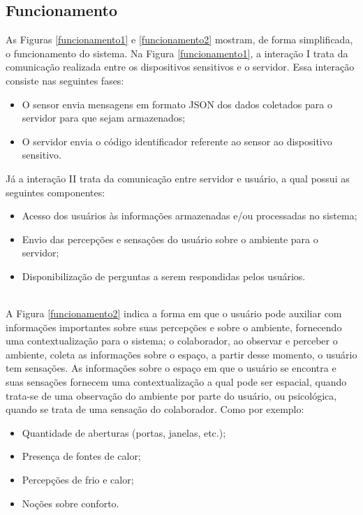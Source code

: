 \subsection{Funcionamento}
\null \quad As Figuras \ref{funcionamento1} e \ref{funcionamento2} mostram, de forma simplificada, o funcionamento do sistema. Na Figura \ref{funcionamento1}, a interação I trata da comunicação realizada entre os dispositivos sensitivos e o servidor. Essa interação consiste nas seguintes fases:

\begin{itemize}
  \item O sensor envia mensagens em formato JSON dos dados coletados para o servidor para que sejam armazenados;
  \item O servidor envia o código identificador referente ao sensor ao dispositivo sensitivo.
\end{itemize}

\null Já a interação II trata da comunicação entre servidor e usuário, a qual possui as seguintes componentes:
\begin{itemize}
  \item Acesso dos usuários às informações armazenadas e/ou processadas no sistema;
  \item Envio das percepções e sensações do usuário sobre o ambiente para o servidor;
  \item Disponibilização de perguntas a serem respondidas pelos usuários.
\end{itemize}


\\\null \quad A Figura \ref{funcionamento2} indica a forma em que o usuário pode auxiliar com informações importantes sobre suas percepções e sobre o ambiente, fornecendo uma contextualização para o sistema; o colaborador, ao observar e perceber o ambiente, coleta as informações sobre o espaço, a partir desse momento, o usuário tem sensações. As informações sobre o espaço em que o usuário se encontra e suas sensações fornecem uma contextualização a qual pode ser espacial, quando trata-se de uma observação do ambiente por parte do usuário, ou psicológica, quando se trata de uma sensação do colaborador. Como por exemplo:
\begin{itemize}
  \item Quantidade de aberturas (portas, janelas, etc.);
  \item Presença de fontes de calor;
  \item Percepções de frio e calor;
  \item Noções sobre conforto.
\end{itemize}
\pagebreak
{}

